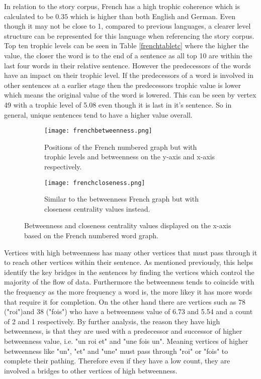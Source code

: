 In relation to the story corpus, French has a high trophic coherence which is calculated to be $0.35$ which is higher than both English and German. Even though it may not be close to 1, compared to previous languages, a clearer level structure can be represented for this language when referencing the story corpus. Top ten trophic levels can be seen in Table \ref{frenchtabletc} where the higher the value, the closer the word is to the end of a sentence as all top 10 are within the last four words in their relative sentence. However the predecessors of the words have an impact on their trophic level. If the predecessors of a word is involved in other sentences at a earlier stage then the predecessors trophic value is lower which means the original value of the word is lowered. This can be seen by vertex 49 with a trophic level of 5.08 even though it is last in it's sentence. So in general, unique sentences tend to have a higher value overall.

\begin{figure}[H]
\centering
\begin{subfigure}{.45\textwidth}
	\hspace{-1cm} 
	\texttt{[image: frenchbetweenness.png]}
	\caption{Positions of the French numbered graph but with trophic levels and betweenness on the y-axis and x-axis respectively.}
	\label{fig:frbc}
\end{subfigure}
\hfill
\begin{subfigure}{.45\textwidth}
	\hspace{-1cm} 
	\texttt{[image: frenchcloseness.png]}
	\caption{Similar to the betweenness French graph but with closeness centrality values instead. }
	\label{fig:frcc}
\end{subfigure}
\caption{Betweenness and closeness centrality values displayed on the x-axis based on the French numbered word graph.}
\label{fig:frcentrality}
\end{figure}

Vertices with high betweenness has many other vertices that must pass through it to reach other vertices within their sentence. As mentioned previously, this helps identify the key bridges in the sentences by finding the vertices which control the majority of the flow of data. Furthermore the betweenness tends to coincide with the frequency as the more frequency a word is, the more likey it has more words that require it for completion. On the other hand there are vertices such as 78 ("roi")and 38 ("fois") who have a betweenness value of 6.73 and 5.54 and a count of 2 and 1 respectively. By further analysis, the reason they have high betweenness, is that they are used with a predecessor and successor of higher betweenness value, i.e. "un roi et" and "une fois un". Meaning vertices of higher betweenness like "un", "et" and "une" must pass through "roi" or "fois" to complete their pathing. Therefore even if they have a low count, they are involved a bridges to other vertices of high betweenness.

